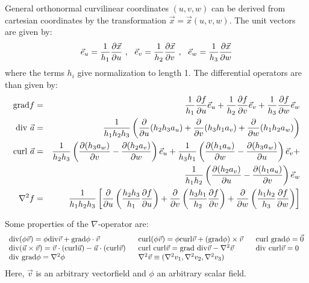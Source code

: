 \documentclass[twoside]{report}
\begin{document}
General orthonormal curvilinear coordinates $(u,v,w)$ can be derived from
cartesian coordinates by the transformation $\vec{x}=\vec{x}(u,v,w)$. The unit
vectors are given by:
\[
\vec{e}_{u}=\frac{1}{h_1}\frac{\partial \vec{x}}{\partial u}~,~~ \vec{e}_{v}=\frac{1}{h_2}\frac{\partial \vec{x}}{\partial v}~,~~
\vec{e}_{w}=\frac{1}{h_3}\frac{\partial \vec{x}}{\partial w}
\]
where the terms $h_i$ give normalization to length 1. The differential operators
are than given by:
\begin{eqnarray*}
{\rm grad}f      &=&\frac{1}{h_1}\frac{\partial f}{\partial u}\vec{e}_{u}+\frac{1}{h_2}\frac{\partial f}{\partial v}\vec{e}_{v}+\frac{1}{h_3}\frac{\partial f}{\partial w}\vec{e}_{w}\\
{\rm div}~\vec{a}&=&\frac{1}{h_1h_2h_3}\left(\frac{\partial }{\partial u}(h_2h_3a_u)+\frac{\partial }{\partial v}(h_3h_1a_v)+\frac{\partial }{\partial w}(h_1h_2a_w)\right)\\
{\rm curl}~\vec{a}&=&\frac{1}{h_2h_3}\left(\frac{\partial (h_3a_w)}{\partial v}-\frac{\partial (h_2a_v)}{\partial w}\right)\vec{e}_{u}+
                    \frac{1}{h_3h_1}\left(\frac{\partial (h_1a_u)}{\partial w}-\frac{\partial (h_3a_w)}{\partial u}\right)\vec{e}_{v}+\\
                  &&\frac{1}{h_1h_2}\left(\frac{\partial (h_2a_v)}{\partial u}-\frac{\partial (h_1a_u)}{\partial v}\right)\vec{e}_{w}\\
\nabla^2 f       &=&\frac{1}{h_1h_2h_3}\left[\frac{\partial }{\partial u}\left(\frac{h_2h_3}{h_1}\frac{\partial f}{\partial u}\right)+
                    \frac{\partial }{\partial v}\left(\frac{h_3h_1}{h_2}\frac{\partial f}{\partial v}\right)+
                    \frac{\partial }{\partial w}\left(\frac{h_1h_2}{h_3}\frac{\partial f}{\partial w}\right)\right]
\end{eqnarray*}

Some properties of the $\nabla$-operator are:
\[
\begin{array}{l@{~~~~~}l@{~~~~~}l}
{\rm div}(\phi\vec{v})=\phi{\rm div}\vec{v}+{\rm grad}\phi\cdot\vec{v}&
{\rm curl}(\phi\vec{v})=\phi{\rm curl}\vec{v}+({\rm grad}\phi)\times\vec{v}&{\rm curl~grad}\phi=\vec{0}\\
{\rm div}(\vec{u}\times\vec{v})=\vec{v}\cdot({\rm curl}\vec{u})-\vec{u}\cdot({\rm curl}\vec{v})&
{\rm curl~curl}\vec{v}={\rm grad~div}\vec{v}-\nabla^2\vec{v}&{\rm div~curl}\vec{v}=0\\
{\rm div~grad}\phi=\nabla^2\phi&\nabla^2\vec{v}\equiv(\nabla^2v_1,\nabla^2v_2,\nabla^2v_3)
\end{array}
\]
Here, $\vec{v}$ is an arbitrary vectorfield and $\phi$ an arbitrary scalar
field.
\end{document}
